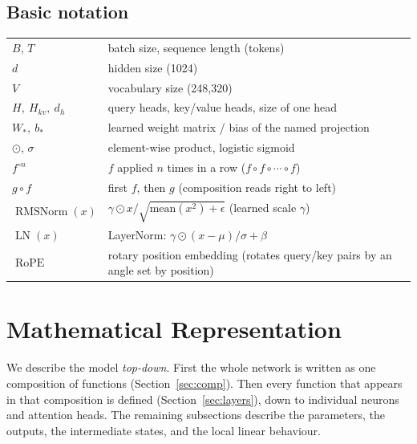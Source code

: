 \documentclass[10pt,a4paper]{article}
\newcommand{\op}[1]{\operatorname{#1}}
\theoremstyle{definition}
\begin{document}
\subsection*{Basic notation}
\begin{tabular}{ll}
\toprule
$B$, $T$ & batch size, sequence length (tokens) \\
$d$ & hidden size (1024) \\
$V$ & vocabulary size (248,320) \\
$H,\ H_{kv},\ d_h$ & query heads, key/value heads, size of one head \\
$W_\ast,\ b_\ast$ & learned weight matrix / bias of the named projection \\
$\odot$, $\sigma$ & element-wise product, logistic sigmoid \\
$f^{\circ n}$ & $f$ applied $n$ times in a row ($f\circ f\circ\cdots\circ f$) \\
$g \circ f$ & first $f$, then $g$ (composition reads right to left) \\
$\op{RMSNorm}(x)$ & $\gamma \odot x / \sqrt{\mathrm{mean}(x^2)+\epsilon}$ (learned scale $\gamma$) \\
$\op{LN}(x)$ & LayerNorm: $\gamma\odot(x-\mu)/\sigma + \beta$ \\
$\op{RoPE}$ & rotary position embedding (rotates query/key pairs by an angle set by position) \\
\bottomrule
\end{tabular}
\section{Mathematical Representation}\label{sec:func}
We describe the model \emph{top-down}. First the whole network is written as one composition of functions (Section~\ref{sec:comp}). Then every function that appears in that composition is defined (Section~\ref{sec:layers}), down to individual neurons and attention heads. The remaining subsections describe the parameters, the outputs, the intermediate states, and the local linear behaviour.
\end{document}
